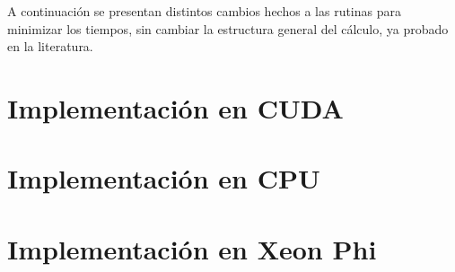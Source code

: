 A continuaci\'on se presentan distintos cambios hechos a las rutinas para minimizar los tiempos,
sin cambiar la estructura general del c\'alculo, ya probado en la literatura.

\section{Implementaci\'on en CUDA}



\section{Implementaci\'on en CPU}



\section{Implementaci\'on en Xeon Phi}


